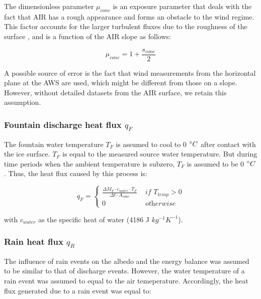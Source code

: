 The dimensionless parameter $\mu_{cone}$ is an exposure parameter that deals with the fact that AIR has a rough
appearance and forms an obstacle to the wind regime. This factor accounts for the larger turbulent fluxes due to
the roughness of the surface \citep{oerlemansBriefCommunicationGrowth2021}, and is a function of the AIR slope
as follows:

\begin{equation}
	\mu_{cone} = 1 + \frac{s_{cone}}{2}
	\label{eqn:mu}
\end{equation}

A possible source of error is the fact that wind measurements from the horizontal plane at the \ac{AWS} are used,
which might be different from those on a slope. However, without detailed datasets from the AIR surface, we
retain this assumption.

\subsubsection{Fountain discharge heat flux \texorpdfstring{$q_{F}$}{Lg} } \label{sec:heatflux}

The fountain water temperature $T_F$ is assumed to cool to 0 $^{\circ} C$ after contact with the ice surface.
$T_F$ is equal to the measured source water temperature. But during time periods when the ambient temperature is
subzero, $T_F$ is assumed to be 0 $^{\circ} C$. Thus, the heat flux caused by this process is:

\begin{equation}
	q_{F} = \left\{ \begin{array}{ll}
		\frac{ \Delta M_F \cdot c_{water} \cdot T_F}{\Delta t \cdot A_{cone}} & \textit{ if } T_{temp} > 0 \\
		0   & \textit{ otherwise}
	\end{array} \right.
\end{equation}

with $c_{water}$ as the specific heat of water (4186 J $kg^{-1} K^{-1}$).

\subsubsection{Rain heat flux \texorpdfstring{$q_{R}$}{Lg} }

The influence of rain events on the albedo and the energy balance was assumed to be similar to that of discharge
events. However, the water temperature of a rain event was assumed to equal to the air temeperature. Accordingly,
the heat flux generated due to a rain event was equal to:

